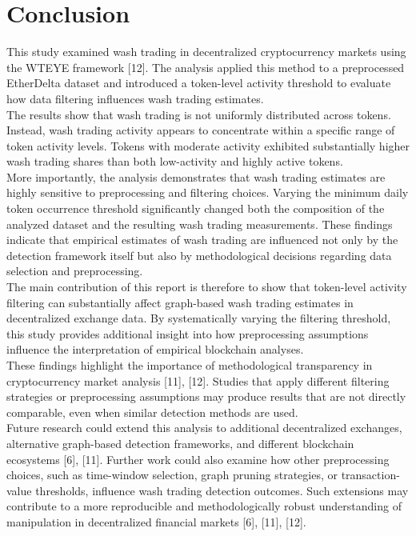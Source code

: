 \documentclass[language=english,thesis=bachelor,nosecondtitle,faculty=cb,onesided,12pt]{hsmw-thesis}
\begin{document}
	\chapter{Conclusion}
This study examined wash trading in decentralized cryptocurrency markets using the WTEYE framework [12]. The analysis applied this method to a preprocessed EtherDelta dataset and introduced a token-level activity threshold to evaluate how data filtering influences wash trading estimates.\\
The results show that wash trading is not uniformly distributed across tokens. Instead, wash trading activity appears to concentrate within a specific range of token activity levels. Tokens with moderate activity exhibited substantially higher wash trading shares than both low-activity and highly active tokens.\\
More importantly, the analysis demonstrates that wash trading estimates are highly sensitive to preprocessing and filtering choices. Varying the minimum daily token occurrence threshold significantly changed both the composition of the analyzed dataset and the resulting wash trading measurements. These findings indicate that empirical estimates of wash trading are influenced not only by the detection framework itself but also by methodological decisions regarding data selection and preprocessing.\\
The main contribution of this report is therefore to show that token-level activity filtering can substantially affect graph-based wash trading estimates in decentralized exchange data. By systematically varying the filtering threshold, this study provides additional insight into how preprocessing assumptions influence the interpretation of empirical blockchain analyses.\\
These findings highlight the importance of methodological transparency in cryptocurrency market analysis [11], [12]. Studies that apply different filtering strategies or preprocessing assumptions may produce results that are not directly comparable, even when similar detection methods are used.\\
Future research could extend this analysis to additional decentralized exchanges, alternative graph-based detection frameworks, and different blockchain ecosystems [6], [11]. Further work could also examine how other preprocessing choices, such as time-window selection, graph pruning strategies, or transaction-value thresholds, influence wash trading detection outcomes. Such extensions may contribute to a more reproducible and methodologically robust understanding of manipulation in decentralized financial markets [6], [11], [12].
\clearpage
\printbibliography[heading=bibintoc] %
\end{document}
